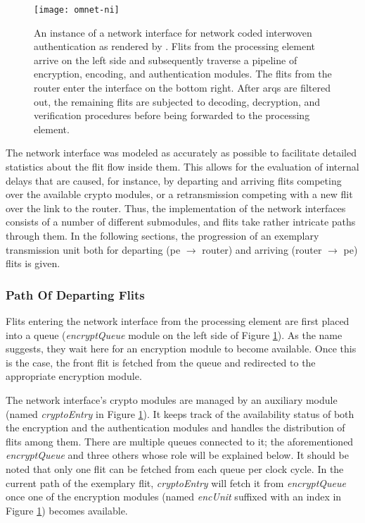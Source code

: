 \begin{figure}
    \centering
    \texttt{[image: omnet-ni]}
    \caption[Simulator view of the network interface]{An instance of a network interface for network coded interwoven authentication as rendered by
    \omnet{}. Flits from the processing element arrive on the left side and subsequently traverse a pipeline of encryption, encoding, and
    authentication modules. The flits from the router enter the interface on the bottom right. After \glspl{arq} are filtered out, the remaining flits
    are subjected to decoding, decryption, and verification procedures before being forwarded to the processing element.}
    \label{fig:omnetni}
\end{figure}

The network interface was modeled as accurately as possible to facilitate detailed statistics about the flit flow inside them. This allows for the
evaluation of internal delays that are caused, for instance, by departing and arriving flits competing over the available crypto modules, or a
retransmission competing with a new flit over the link to the router. Thus, the implementation of the network interfaces consists of a number of
different submodules, and flits take rather intricate paths through them. In the following sections, the progression of an exemplary transmission unit
both for departing (\gls{pe} $\rightarrow$ router) and arriving (router $\rightarrow$ \gls{pe}) flits is given.

\subsubsection{Path Of Departing Flits}
Flits entering the network interface from the processing element are first placed into a queue (\textit{encryptQueue} module on the left side of
Figure \ref{fig:omnetni}). As the name suggests, they wait here for an encryption module to become available. Once this is the case, the front
flit is fetched from the queue and redirected to the appropriate encryption module.

The network interface's crypto modules are managed by an auxiliary module (named \textit{cryptoEntry} in Figure \ref{fig:omnetni}). It keeps track of
the availability status of both the encryption and the authentication modules and handles the distribution of flits among them. There are multiple
queues connected to it; the aforementioned \textit{encryptQueue} and three others whose role will be explained below. It should be noted that only one
flit can be fetched from each queue per clock cycle. In the current path of the exemplary flit, \textit{cryptoEntry} will fetch it from
\textit{encryptQueue} once one of the encryption modules (named \textit{encUnit} suffixed with an index in Figure \ref{fig:omnetni}) becomes
available.

